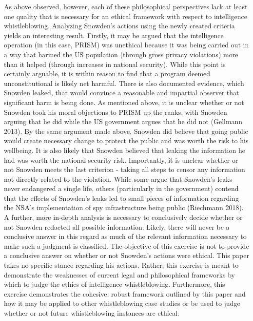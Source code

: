 \documentclass [12 pt] {article}
\begin{document}
\bigbreak
As above observed, however, each of these philosophical perspectives lack at least one quality that is necessary for an ethical framework with respect to intelligence whistleblowing. Analyzing Snowden's actions using the newly created criteria yields an interesting result. Firstly, it may be argued that the intelligence operation (in this case, PRISM) was unethical because it was being carried out in a way that harmed the US population (through gross privacy violations) more than it helped (through increases in national security). While this point is certainly arguable, it is within reason to find that a program deemed unconstitutional is likely net harmful. There is also documented evidence, which Snowden leaked, that would convince a reasonable and impartial observer that significant harm is being done. As mentioned above, it is unclear whether or not Snowden took his moral objections to PRISM up the ranks, with Snowden arguing that he did while the US government argues that he did not (Gellmann 2013). By the same argument made above, Snowden did believe that going public would create necessary change to protect the public and was worth the risk to his wellbeing. It is also likely that Snowden believed that leaking the information he had was worth the national security risk. Importantly, it is unclear whether or not Snowden meets the last criterion - taking all steps to censor any information not directly related to the violation. While some argue that Snowden's leaks never endangered a single life, others (particularly in the government) contend that the effects of Snowden's leaks led to small pieces of information regarding the NSA's implementation of spy infrastructure being public (Riechmann 2018). A further, more in-depth analysis is necessary to conclusively decide whether or not Snowden redacted all possible information. Likely, there will never be a conclusive answer in this regard as much of the relevant information necessary to make such a judgment is classified.
\bigbreak
The objective of this exercise is not to provide a conclusive answer on whether or not Snowden's actions were ethical. This paper takes no specific stance regarding his actions. Rather, this exercise is meant to demonstrate the weaknesses of current legal and philosophical frameworks by which to judge the ethics of intelligence whistleblowing. Furthermore, this exercise demonstrates the cohesive, robust framework outlined by this paper and how it may be applied to other whistleblowing case studies or be used to judge whether or not future whistleblowing instances are ethical.
\end{document}
